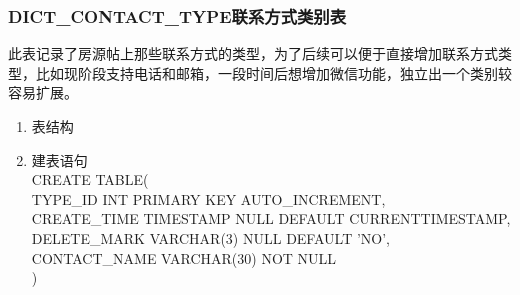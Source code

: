 \subsubsection{DICT\_CONTACT\_TYPE联系方式类别表}
此表记录了房源帖上那些联系方式的类型，为了后续可以便于直接增加联系方式类型，比如现阶段支持电话和邮箱，一段时间后想增加微信功能，独立出一个类别较容易扩展。
\begin{enumerate}
    \item 表结构
    \begin{table}[htbp]
        \centering
        \end{table}
    \item 建表语句\\
        CREATE TABLE(\\
            TYPE\_ID INT PRIMARY KEY AUTO\_INCREMENT,\\
            CREATE\_TIME TIMESTAMP NULL DEFAULT CURRENTTIMESTAMP,\\
            DELETE\_MARK VARCHAR(3) NULL DEFAULT 'NO',\\
            CONTACT\_NAME VARCHAR(30) NOT NULL\\
        )
    \end{enumerate}


